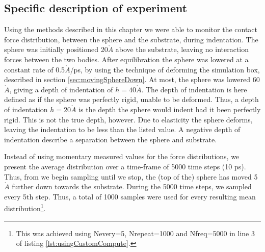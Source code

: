 \documentclass[twoside,english]{uiofysmaster}
\begin{document}
\subsection{Specific description of experiment} \label{sec:resultsRadialForceDistributionSpecificDescriptionOfExperiment}
Using the methods described in this chapter we were able to monitor the contact force distribution, between the sphere and the substrate, during indentation. 
The sphere was initially positioned 20$\mathring{A}$ above the substrate, leaving no interaction forces between the two bodies.  
After equilibration the sphere was lowered at a constant rate of 0.5$\mathring{A}$/ps, by using the technique of deforming the simulation box, described in section \ref{sec:movingSphereDown}. 
At most, the sphere was lowered 60$\mathring{A}$, giving a depth of indentation of $h=40\mathring{A}$. 
The depth of indentation is here defined as if the sphere was perfectly rigid, unable to be deformed. 
Thus, a depth of indentation $h=20 \mathring{A}$ is the depth the sphere would indent had it been perfectly rigid. 
This is not the true depth, however. 
Due to elasticity the sphere deforms, leaving the indentation to be less than the listed value. 
A negative depth of indentation describe a separation between the sphere and substrate.   


Instead of using momentary measured values for the force distributions, we present the average distribution over a time-frame of 5000 time steps (10 ps). 
Thus, from we begin sampling until we stop, the (top of the) sphere has moved 5$\mathring{A}$ further down towards the substrate.  
During the 5000 time steps, we sampled every 5th step. 
Thus, a total of 1000 samples were used for every resulting mean distribution\footnote{This was achieved using  Nevery=5,  Nrepeat=1000 and Nfreq=5000 in line 3 of listing \ref{lst:usingCustomCompute}.}.
\end{document}
